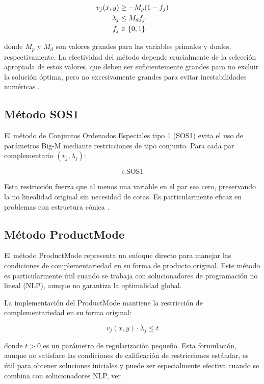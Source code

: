 \begin{align}
    v_j(x,y) &\geq -M_p(1 - f_j) \notag \\
    \lambda_j &\leq M_d f_j \\
    f_j &\in \{0,1\} \notag
\end{align}

donde $M_p$ y $M_d$ son valores grandes para las variables primales y duales, respectivamente. La efectividad del método depende crucialmente de la selección apropiada de estos valores, que deben ser suficientemente grandes para no excluir la solución óptima, pero no excesivamente grandes para evitar inestabilidades numéricas \cite{BilevelJump}.


\subsection{Método SOS1}

El método de Conjuntos Ordenados Especiales tipo 1 (SOS1) evita el uso de parámetros Big-M mediante restricciones de tipo conjunto. Para cada par complementario $(v_j, \lambda_j)$:

\begin{equation}
[v_j(x,y); \lambda_j] \in \text{SOS1} \label{eq:SOS1_reform}
\end{equation}

Esta restricción fuerza que al menos una variable en el par sea cero, preservando la no linealidad original sin necesidad de cotas. Es particularmente eficaz en problemas con estructura cónica \cite{BilevelJump}.


\subsection{Método ProductMode}

El método ProductMode representa un enfoque directo para manejar las condiciones de complementariedad en su forma de producto original. Este método es particularmente útil cuando se trabaja con solucionadores de programación no lineal (NLP), aunque no garantiza la optimalidad global.

La implementación del ProductMode mantiene la restricción de complementariedad en su forma original:

\begin{equation}
    v_j(x,y) \cdot \lambda_j \leq t \label{eq:ProductMode_reg}
\end{equation}

donde $t > 0$ es un parámetro de regularización pequeño. Esta formulación, aunque no satisface las condiciones de calificación de restricciones estándar, es útil para obtener soluciones iniciales y puede ser especialmente efectiva cuando se combina con solucionadores NLP, ver \cite{BilevelJump}.



